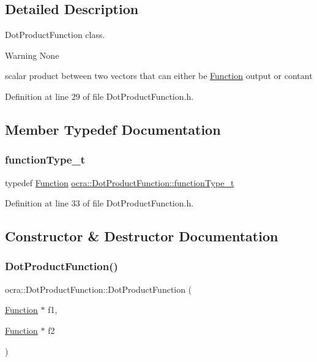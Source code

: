 \subsection{Detailed Description}
Dot\+Product\+Function class. 

\begin{DoxyWarning}{Warning}
None
\end{DoxyWarning}
scalar product between two vectors that can either be \hyperlink{classocra_1_1Function}{Function} output or contant 

Definition at line 29 of file Dot\+Product\+Function.\+h.



\subsection{Member Typedef Documentation}
\hypertarget{classocra_1_1DotProductFunction_abdc60b6380ffedc075792224bd908c48}{}\label{classocra_1_1DotProductFunction_abdc60b6380ffedc075792224bd908c48} 
\subsubsection{\texorpdfstring{function\+Type\+\_\+t}{functionType\_t}}
{\footnotesize\ttfamily typedef \hyperlink{classocra_1_1Function}{Function} \hyperlink{classocra_1_1DotProductFunction_abdc60b6380ffedc075792224bd908c48}{ocra\+::\+Dot\+Product\+Function\+::function\+Type\+\_\+t}}



Definition at line 33 of file Dot\+Product\+Function.\+h.



\subsection{Constructor \& Destructor Documentation}
\hypertarget{classocra_1_1DotProductFunction_a70f7d2b9c9fefba0203fbee84607c9e9}{}\label{classocra_1_1DotProductFunction_a70f7d2b9c9fefba0203fbee84607c9e9} 
\subsubsection{\texorpdfstring{Dot\+Product\+Function()}{DotProductFunction()}\hspace{0.1cm}{\footnotesize\ttfamily [1/2]}}
{\footnotesize\ttfamily ocra\+::\+Dot\+Product\+Function\+::\+Dot\+Product\+Function (\begin{DoxyParamCaption}\item[{\hyperlink{classocra_1_1Function}{Function} $\ast$}]{f1,  }\item[{\hyperlink{classocra_1_1Function}{Function} $\ast$}]{f2 }\end{DoxyParamCaption})}

